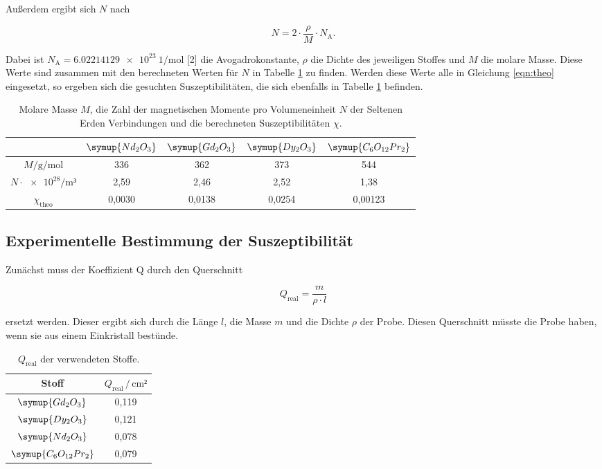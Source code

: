 Außerdem ergibt sich $N$ nach

\begin{equation*}
N = 2 \cdot \frac{\rho}{M}\cdot N_\text{A}.
\end{equation*}

Dabei ist $N_\text{A} = \SI{6.02214129e23}{1\per\mol}$ [2] die 
Avogadrokonstante, $\rho$ die Dichte des jeweiligen Stoffes und $M$
die molare Masse. Diese Werte sind zusammen mit den berechneten Werten für $N$
in Tabelle \ref{tab:theo2} zu finden. Werden diese Werte alle in Gleichung  
\eqref{eqn:theo} eingesetzt, so ergeben sich die gesuchten Suszeptibilitäten, die sich ebenfalls in 
Tabelle \ref{tab:theo2} befinden. 

\begin{table}
\centering
\caption{Molare Masse $M$, die Zahl der magnetischen Momente
pro Volumeneinheit $N$ der Seltenen Erden Verbindungen und die berechneten 
Suszeptibilitäten $\chi$.}
\label{tab:theo2}
\begin{tabular}{c c c c c}
\toprule
& $\symup{Nd_2O_3}$ & $\symup{Gd_2O_3}$ & $\symup{Dy_2O_3}$ & $\symup{C_6O_{12}Pr_2}$\\
\midrule
$M/\si{\gram\per\mol}$           & 336     & 362    & 373    & 544\\
$N \cdot \num{e28}/\si{\meter³}$ & 2,59    & 2,46   & 2,52   & 1,38\\
$\chi_\text{theo}$               & 0,0030 & 0,0138 & 0,0254 & 0,00123\\
\bottomrule
\end{tabular}
\end{table}


\subsection{Experimentelle Bestimmung der Suszeptibilität}

Zunächst muss der Koeffizient Q durch den Querschnitt

\begin{equation}
Q_\text{real} = \frac{m}{\rho \cdot l}
\end{equation}

ersetzt werden. Dieser ergibt sich durch die Länge $l$, die Masse $m$ und 
die Dichte $\rho$ der Probe. Diesen Querschnitt müsste die Probe haben, wenn 
sie aus einem Einkristall bestünde.

\begin{table}
\centering
\caption{$Q_\text{real}$ der verwendeten Stoffe.}
\label{tab:Messdaten2}
\begin{tabular}{c c}
\toprule
Stoff & $Q_\text{real} \,/\, \si{\centi\meter²}$\\
\midrule
$\symup{Gd_2O_3}$ & 0,119\\
$\symup{Dy_2O_3}$ & 0,121\\
$\symup{Nd_2O_3}$ & 0,078\\
$\symup{C_6O_\text{12}Pr_2}$ & 0,079\\
\bottomrule
\end{tabular}
\end{table}

